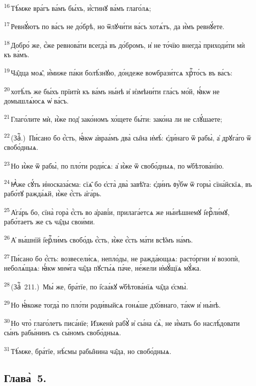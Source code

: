 \textsuperscript{16}\,Тѣ́мже вра́гъ ва́мъ бы́хъ, и҆́стинꙋ ва́мъ глаго́лѧ;

\textsuperscript{17}\,Ревнꙋ́ютъ по ва́съ не до́брѣ, но ѿлꙋчи́ти ва́съ хотѧ́тъ, да и҆̀мъ ревнꙋ́ете.

\textsuperscript{18}\,Добро́ же, є҆́же ревнова́ти всегда̀ въ до́бромъ, и҆ не то́чїю внегда̀ приходи́ти мѝ къ ва́мъ.

\textsuperscript{19}\,Ча̑дца моѧ̑, и҆́миже па́ки болѣ́знꙋю, до́ндеже воѡбрази́тсѧ хрⷭ҇то́съ въ ва́съ:

\textsuperscript{20}\,хотѣ́лъ же бы́хъ прїитѝ къ ва́мъ ны́нѣ и҆ и҆змѣни́ти гла́съ мо́й, ꙗ҆́кѡ не домышлѧ́юсѧ ѡ҆ ва́съ.

\textsuperscript{21}\,Глаго́лите мѝ, и҆̀же под̾ зако́номъ хо́щете бы́ти: зако́на ли не слꙋ́шаете;

\textsuperscript{22}\,(Заⷱ҇.)~Пи́сано бо є҆́сть, ꙗ҆́кѡ а҆враа́мъ два̀ сы̑на и҆мѣ̀: є҆ди́наго ѿ рабы̀, а҆ дрꙋга́го ѿ свобо́дныѧ.

\textsuperscript{23}\,Но и҆́же ѿ рабы̀, по пло́ти роди́сѧ: а҆ и҆́же ѿ свобо́дныѧ, по ѡ҆бѣтова́нїю.

\textsuperscript{24}\,Ꙗ҆̀же сꙋ́ть и҆носказа́єма: сїѧ̑ бо є҆ста̀ два̀ завѣ̑та: є҆ди́нъ ᲂу҆́бѡ ѿ горы̀ сїна́йскїѧ, въ рабо́тꙋ ражда́ѧй, и҆́же є҆́сть а҆га́рь.

\textsuperscript{25}\,А҆га́рь бо, сїна̀ гора̀ є҆́сть во а҆раві́и, прилага́етсѧ же ны́нѣшнемꙋ і҆ерⷭ҇ли́мꙋ, рабо́таетъ же съ ча̑ды свои́ми.

\textsuperscript{26}\,А҆ вы́шнїй і҆ерⷭ҇ли́мъ свобо́дь є҆́сть, и҆́же є҆́сть ма́ти всѣ̑мъ на́мъ.

\textsuperscript{27}\,Пи́сано бо є҆́сть: возвесели́сѧ, непло́ды, не ражда́ющаѧ: расто́ргни и҆ возопѝ, неболѧ́щаѧ: ꙗ҆́кѡ мнѡ́га ча̑да пꙋсты́ѧ па́че, не́жели и҆мꙋ́щїѧ мꙋ́жа.

\textsuperscript{28}\,(Заⷱ҇~211.)~Мы́ же, бра́тїе, по і҆саа́кꙋ ѡ҆бѣтова́нїѧ ча̑да є҆смы̀.

\textsuperscript{29}\,Но ꙗ҆́коже тогда̀ по пло́ти роди́выйсѧ гонѧ́ше дх҃о́внаго, та́кѡ и҆ ны́нѣ.

\textsuperscript{30}\,Но что̀ глаго́летъ писа́нїе; И҆зженѝ рабꙋ̀ и҆ сы́на є҆ѧ̀, не и҆́мать бо наслѣ́довати сы́нъ рабы́нинъ съ сы́номъ свобо́дныѧ.

\textsuperscript{31}\,Тѣ́мже, бра́тїе, нѣ́смы рабы̑нина ча̑да, но свобо́дныѧ.

\subsection{Глава̀~5.}

